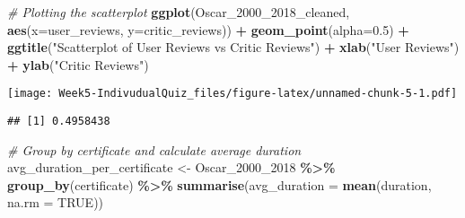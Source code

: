 \documentclass[
]{article}
\newenvironment{Shaded}{\begin{snugshade}}{\end{snugshade}}
\newcommand{\AttributeTok}[1]{\textcolor[rgb]{0.13,0.29,0.53}{#1}}
\newcommand{\CommentTok}[1]{\textcolor[rgb]{0.56,0.35,0.01}{\textit{#1}}}
\newcommand{\ConstantTok}[1]{\textcolor[rgb]{0.56,0.35,0.01}{#1}}
\newcommand{\FloatTok}[1]{\textcolor[rgb]{0.00,0.00,0.81}{#1}}
\newcommand{\FunctionTok}[1]{\textcolor[rgb]{0.13,0.29,0.53}{\textbf{#1}}}
\newcommand{\NormalTok}[1]{#1}
\newcommand{\OtherTok}[1]{\textcolor[rgb]{0.56,0.35,0.01}{#1}}
\newcommand{\SpecialCharTok}[1]{\textcolor[rgb]{0.81,0.36,0.00}{\textbf{#1}}}
\newcommand{\StringTok}[1]{\textcolor[rgb]{0.31,0.60,0.02}{#1}}
\begin{document}
\begin{Shaded}
\begin{Highlighting}[]
\CommentTok{\# Plotting the scatterplot}
\FunctionTok{ggplot}\NormalTok{(Oscar\_2000\_2018\_cleaned, }\FunctionTok{aes}\NormalTok{(}\AttributeTok{x=}\NormalTok{user\_reviews, }\AttributeTok{y=}\NormalTok{critic\_reviews)) }\SpecialCharTok{+}
  \FunctionTok{geom\_point}\NormalTok{(}\AttributeTok{alpha=}\FloatTok{0.5}\NormalTok{) }\SpecialCharTok{+}
  \FunctionTok{ggtitle}\NormalTok{(}\StringTok{"Scatterplot of User Reviews vs Critic Reviews"}\NormalTok{) }\SpecialCharTok{+}
  \FunctionTok{xlab}\NormalTok{(}\StringTok{"User Reviews"}\NormalTok{) }\SpecialCharTok{+}
  \FunctionTok{ylab}\NormalTok{(}\StringTok{"Critic Reviews"}\NormalTok{)}
\end{Highlighting}
\end{Shaded}

\texttt{[image: Week5-IndivudualQuiz\_files/figure-latex/unnamed-chunk-5-1.pdf]}

\begin{Shaded}
\end{Shaded}

\begin{verbatim}
## [1] 0.4958438
\end{verbatim}

\begin{Shaded}
\begin{Highlighting}[]
\CommentTok{\# Group by certificate and calculate average duration}
\NormalTok{avg\_duration\_per\_certificate }\OtherTok{\textless{}{-}}\NormalTok{ Oscar\_2000\_2018 }\SpecialCharTok{\%\textgreater{}\%}
  \FunctionTok{group\_by}\NormalTok{(certificate) }\SpecialCharTok{\%\textgreater{}\%}
  \FunctionTok{summarise}\NormalTok{(}\AttributeTok{avg\_duration =} \FunctionTok{mean}\NormalTok{(duration, }\AttributeTok{na.rm =} \ConstantTok{TRUE}\NormalTok{))}
\end{Highlighting}
\end{Shaded}
\end{document}
